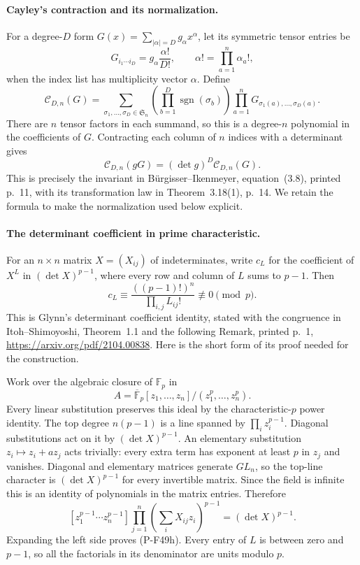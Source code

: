 \documentclass[11pt,a4paper]{article}
\begin{document}
\paragraph{Cayley's contraction and its normalization.}
For a degree-$D$ form
$G(x)=\sum_{|\alpha|=D}g_\alpha x^\alpha$, let its
symmetric tensor entries be
\[
       G_{i_1\cdots i_D}=g_\alpha\frac{\alpha!}{D!},
       \qquad \alpha!=\prod_{a=1}^n\alpha_a!,
                                                        \tag{P-F49e}
\]
when the index list has multiplicity vector $\alpha$.
Define
\[
 \mathcal C_{D,n}(G)=
 \sum_{\sigma_1,\ldots,\sigma_D\in\mathfrak S_n}
 \left(\prod_{b=1}^D\operatorname{sgn}(\sigma_b)\right)
 \prod_{a=1}^n G_{\sigma_1(a),\ldots,\sigma_D(a)}.
                                                        \tag{P-F49f}
\]
There are $n$ tensor factors in each summand, so this
is a degree-$n$ polynomial in the coefficients of $G$.
Contracting each column of $n$ indices with a determinant
gives
\[
             \mathcal C_{D,n}(gG)
                          =(\det g)^D\mathcal C_{D,n}(G).
                                                        \tag{P-F49g}
\]
This is precisely the invariant in B\"urgisser--Ikenmeyer,
equation~(3.8), printed p.~11, with its transformation
law in Theorem~3.18(1), p.~14. We retain the formula to
make the normalization used below explicit.

\paragraph{The determinant coefficient in prime characteristic.}
For an $n\times n$ matrix $X=(X_{ij})$ of indeterminates,
write $c_L$ for the coefficient of $X^L$ in
$(\det X)^{p-1}$, where every row and column of $L$ sums
to $p-1$. Then
\[
       c_L\equiv\frac{((p-1)!)^n}{\prod_{i,j}L_{ij}!}
                                 \not\equiv0\pmod p.  \tag{P-F49h}
\]
This is Glynn's determinant coefficient identity, stated
with the congruence in Itoh--Shimoyoshi,
Theorem~1.1 and the following Remark, printed p.~1,
\url{https://arxiv.org/pdf/2104.00838}.
Here is the short form of its proof needed for the construction.

Work over the algebraic closure of $\mathbb F_p$ in
\[
        A=\overline{\mathbb F}_p[z_1,\ldots,z_n]
                                      /(z_1^p,\ldots,z_n^p).
\]
Every linear substitution preserves this ideal by
the characteristic-$p$ power identity. The top degree
$n(p-1)$ is a line spanned by $\prod_i z_i^{p-1}$.
Diagonal substitutions act on it by $(\det X)^{p-1}$.
An elementary substitution $z_i\mapsto z_i+a z_j$
acts trivially: every extra term has exponent at least
$p$ in $z_j$ and vanishes. Diagonal and elementary
matrices generate $GL_n$, so the top-line character is
$(\det X)^{p-1}$ for every invertible matrix. Since the
field is infinite this is an identity of polynomials
in the matrix entries. Therefore
\[
 [z_1^{p-1}\cdots z_n^{p-1}]
     \prod_{j=1}^n\left(\sum_i X_{ij}z_i\right)^{p-1}
                          =(\det X)^{p-1}.             \tag{P-F49i}
\]
Expanding the left side proves (P-F49h). Every entry
of $L$ is between zero and $p-1$, so all the factorials
in its denominator are units modulo $p$.
\end{document}
